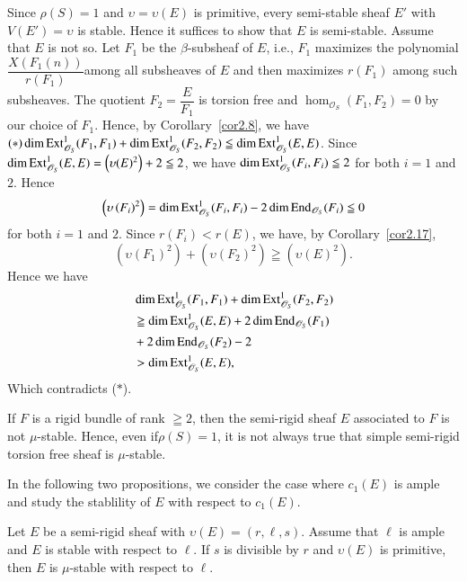 \begin{Proof}
Since $\rho(S)=1$ and $\upsilon=\upsilon(E)$ is primitive, every semi-stable
sheaf $E'$ with $V(E')=\upsilon$ is stable. Hence it suffices to
show that $E$ is semi-stable. Assume that $E$ is not so. Let $F_1$ be
the $\beta$-subsheaf of $E$, i.e., $F_1$ maximizes the polynomial
$\dfrac{X(F_1(n))}{r(F_1)}$\pageoriginale among all subsheaves  of $E$ and then
maximizes $r(F_1)$ among such subsheaves. The quotient
$F_2=\dfrac{E}{F_1}$ is torsion free and
$\hom_{\mathscr{O}_S}(F_1,F_2)=0$ by our choice of $F_1$. Hence, by
Corollary~\ref{cor2.8}, we have 
$(\ast)
\dim \mathrm{Ext}^{1}_{\mathscr{O}_S}(F_1,F_1)+\dim \mathrm{Ext}^{1}_{\mathscr{O}_S}(F_2,F_2)\leqq
\dim \mathrm{Ext}^{1}_{\mathscr{O}_S}(E,E)$. 
Since $\dim \mathrm{Ext}^{1}_{\mathscr{O}_S}(E,E)=\left(\upsilon(E)^{2}\right)+2\leqq 2$,
we have $\dim \mathrm{Ext}^{1}_{\mathscr{O}_S}(F_i,F_i)\leqq 2$ for both $i=1$
and $2$. Hence
$$
\left(\upsilon\left(F_i\right)^{2}\right)=\dim \mathrm{Ext}^{1}_{\mathscr{O}_S}(F_i,F_i)-2\dim\mathrm{End}_{\mathscr{O}_S}(F_i)\leqq 0
$$ 
for both $i=1$ and $2$. Since
$r(F_i)<r(E)$, we have, by Corollary~\ref{cor2.17}, 
$$
\left(\upsilon(F_1)^{2}\right)+\left(\upsilon(F_2)^{2}\right)\geqq \left(\upsilon(E)^{2}\right).
$$
Hence we have 
$$
\begin{aligned}
&\dim \mathrm{Ext}^{1}_{\mathscr{O}_S}(F_1,F_1)+\dim\mathrm{Ext}^{1}_{\mathscr{O}_S}(F_2,F_2)\\
&{}\geqq \dim\mathrm{Ext}^{1}_{\mathscr{O}_S}(E,E)+2\dim
\mathrm{End}_{\mathscr{O}_S}(F_1)\\
&{}+2\dim \mathrm{End}_{\mathscr{O}_S}(F_2)-2\\
&{}>\dim \mathrm{Ext}^{1}_{\mathscr{O}_S}(E,E),
\end{aligned}
$$
Which contradicts ($\ast$).
\enprf
\end{Proof}

\begin{remark}\label{remark3.15}
If $F$ is a rigid bundle of rank $\geqq 2$, then the semi-rigid sheaf
$E$ associated to $F$ is not $\mu$-stable. Hence, even if\pageoriginale $\rho(S)=1$,
it is not always true that simple semi-rigid torsion free sheaf is
$\mu$-stable.

In the following two propositions, we consider the case where $c_1(E)$
is ample and study the stablility of $E$ with respect to $c_1(E)$. 
\end{remark}

\begin{Prop}\label{Prop3.16}
Let $E$ be a semi-rigid sheaf with $\upsilon(E)=(r,\ell, s)$. Assume
that $\ell$ is ample and $E$ is stable with respect to $\ell$. If $s$
is divisible by $r$ and $\upsilon(E)$ is primitive, then $E$ is
$\mu$-stable with respect to $\ell$. 
\end{Prop}

